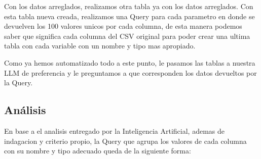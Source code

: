 \documentclass[9pt,letterpaper,twoside]{article}
\begin{document}
\begin{code}[H]
    
\end{code}

\noindent
Con los datos arreglados, realizamos otra tabla ya con los datos arreglados. Con esta tabla nueva creada, realizamos una Query para cada parametro en donde se devuelven los 100 valores unicos
por cada columna, de esta manera podemos saber que significa cada columna del CSV original para poder crear una ultima tabla con cada variable con un nombre y tipo mas apropiado.

\begin{code}[H]
    
\end{code}

\newpage

\begin{code}[H]
    
\end{code}

\noindent
Como ya hemos automatizado todo a este punto, le pasamos las tablas a nuestra LLM de preferencia y le preguntamos a que corresponden los datos devueltos por la Query.

\noindent

\newpage

\subsection{Análisis}

\noindent
En base a el analisis entregado por la Inteligencia Artificial, ademas de indagacion y criterio propio, la Query que agrupa los valores de cada columna con su nombre y tipo adecuado queda de la
siguiente forma:

\begin{code}[H]
    
\end{code}

\newpage

\begin{code}[H]
    
\end{code}
\end{document}
